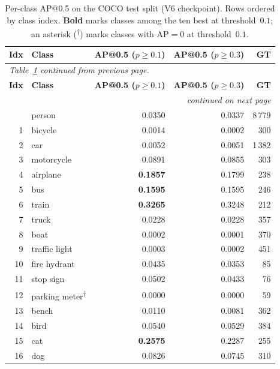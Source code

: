 \begin{longtable}{rlrrr}
\caption{Per-class AP@0.5 on the COCO test split (V6 checkpoint). Rows
ordered by class index. \textbf{Bold} marks classes among the ten best
at threshold~$0.1$; an asterisk (\textsuperscript{$\dagger$}) marks classes
with $\mathrm{AP}=0$ at threshold~$0.1$.}
\label{tab:per-class-ap}\\
\toprule
\textbf{Idx} & \textbf{Class} & \textbf{AP@0.5 ($p\!\ge\!0.1$)} & \textbf{AP@0.5 ($p\!\ge\!0.3$)} & \textbf{GT} \\
\midrule
\endfirsthead
\multicolumn{5}{l}{\small\textit{Table~\ref{tab:per-class-ap} continued from previous page.}}\\
\toprule
\textbf{Idx} & \textbf{Class} & \textbf{AP@0.5 ($p\!\ge\!0.1$)} & \textbf{AP@0.5 ($p\!\ge\!0.3$)} & \textbf{GT} \\
\midrule
\endhead
\midrule
\multicolumn{5}{r}{\small\textit{continued on next page}}\\
\endfoot
\bottomrule
\endlastfoot
 0 & person          & 0.0350 & 0.0337 & 8\,779 \\
 1 & bicycle         & 0.0014 & 0.0002 &    300 \\
 2 & car             & 0.0052 & 0.0051 & 1\,382 \\
 3 & motorcycle      & 0.0891 & 0.0855 &    303 \\
 4 & airplane        & \textbf{0.1857} & 0.1799 &    238 \\
 5 & bus             & \textbf{0.1595} & 0.1595 &    246 \\
 6 & train           & \textbf{0.3265} & 0.3248 &    212 \\
 7 & truck           & 0.0228 & 0.0228 &    357 \\
 8 & boat            & 0.0002 & 0.0001 &    370 \\
 9 & traffic light   & 0.0003 & 0.0002 &    451 \\
10 & fire hydrant    & 0.0435 & 0.0353 &     85 \\
11 & stop sign       & 0.0502 & 0.0433 &     76 \\
12 & parking meter\textsuperscript{$\dagger$}   & 0.0000 & 0.0000 &     59 \\
13 & bench           & 0.0110 & 0.0081 &    362 \\
14 & bird            & 0.0540 & 0.0529 &    384 \\
15 & cat             & \textbf{0.2575} & 0.2287 &    255 \\
16 & dog             & 0.0826 & 0.0745 &    310 \\

\end{longtable}
